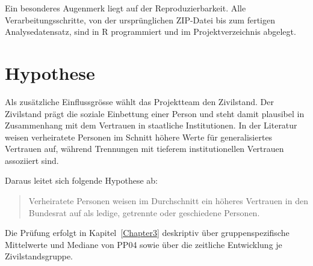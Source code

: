 Ein besonderes Augenmerk liegt auf der Reproduzierbarkeit. Alle Verarbeitungsschritte,
von der ursprünglichen ZIP-Datei bis zum fertigen Analysedatensatz, sind in R
programmiert und im Projektverzeichnis abgelegt.


\section{Hypothese}
\label{sec:hypothese}

Als zusätzliche Einflussgrösse wählt das Projektteam den Zivilstand.
Der Zivilstand prägt die soziale Einbettung einer Person und steht damit plausibel in
Zusammenhang mit dem Vertrauen in staatliche Institutionen. In der Literatur weisen
verheiratete Personen im Schnitt höhere Werte für generalisiertes Vertrauen auf, während
Trennungen mit tieferem institutionellen Vertrauen assoziiert sind.

Daraus leitet sich folgende Hypothese ab:

\begin{quote}
Verheiratete Personen weisen im Durchschnitt ein höheres Vertrauen in den Bundesrat
auf als ledige, getrennte oder geschiedene Personen.
\end{quote}

Die Prüfung erfolgt in Kapitel~\ref{Chapter3} deskriptiv über gruppenspezifische
Mittelwerte und Mediane von PP04 sowie über die zeitliche Entwicklung je
Zivilstandsgruppe.